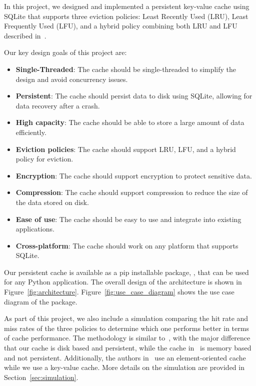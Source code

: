 \documentclass[11pt, journal]{IEEEtran}
\begin{document}
In this project, we designed and implemented a
persistent key-value cache using SQLite
that supports three eviction policies: Least Recently Used (LRU),
Least Frequently Used (LFU), and a hybrid policy combining both LRU and LFU
described in~\cite{shah2023ImprovedCacheEviction}.


Our key design goals of this project are:
\begin{itemize}
    \item \textbf{Single-Threaded}: The cache should be single-threaded to simplify the design and avoid concurrency issues.
    \item \textbf{Persistent}: The cache should persist data to disk using SQLite, allowing for data recovery after a crash.
    \item \textbf{High capacity}: The cache should be able to store a large amount of data efficiently.
    \item \textbf{Eviction policies}: The cache should support LRU, LFU, and a hybrid policy for eviction.
    \item \textbf{Encryption}: The cache should support encryption to protect sensitive data.
    \item \textbf{Compression}: The cache should support compression to reduce the size of the data stored on disk.
    \item \textbf{Ease of use}: The cache should be easy to use and integrate into existing applications.
    \item \textbf{Cross-platform}: The cache should work on any platform that supports SQLite.
\end{itemize}

Our persistent cache is available as a pip installable package,
\sqlitecache, that
can be used for any Python application.
The overall design of the architecture is shown in Figure~\ref{fig:architecture}.
Figure~\ref{fig:use_case_diagram} shows the use case diagram of the package.

As part of this project, we also include a simulation 
comparing the hit rate
and miss rates of the three policies to determine which one performs better
in terms of cache performance. The methodology is similar to~\cite{shah2023ImprovedCacheEviction},
with the major difference that our cache is disk based and persistent,
while the cache in~\cite{shah2023ImprovedCacheEviction} is memory based and not persistent.
Additionally, the authors in~\cite{shah2023ImprovedCacheEviction} use an element-oriented
cache while we use a key-value cache. More details on the simulation
are provided in Section~\ref{sec:simulation}.
\end{document}
